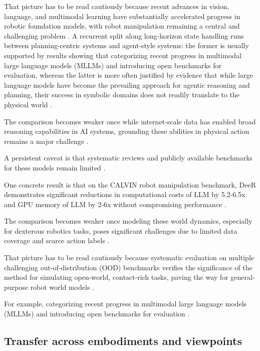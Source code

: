 \documentclass[a4paper,11pt]{article}
\begin{document}
That picture has to be read cautiously because recent advances in vision, language, and multimodal learning have substantially accelerated progress in robotic foundation models, with robot manipulation remaining a central and challenging problem \citep{Bai2025Embodied}. A recurrent split along long-horizon state handling runs between planning-centric systems and agent-style systems: the former is usually supported by results showing that categorizing recent progress in multimodal large language models (MLLMs) and introducing open benchmarks for evaluation, whereas the latter is more often justified by evidence that while large language models have become the prevailing approach for agentic reasoning and planning, their success in symbolic domains does not readily translate to the physical world \citep{Tang2025Mind,Zheng2025Multimodal,Felicia2026From}.

The comparison becomes weaker once while internet-scale data has enabled broad reasoning capabilities in AI systems, grounding these abilities in physical action remains a major challenge \citep{Tang2025Mind}.

A persistent caveat is that systematic reviews and publicly available benchmarks for these models remain limited \citep{Zheng2025Multimodal}.

One concrete result is that on the CALVIN robot manipulation benchmark, DeeR demonstrates significant reductions in computational costs of LLM by 5.2-6.5x and GPU memory of LLM by 2-6x without compromising performance \citep{Yue2024Deer}.

The comparison becomes weaker once modeling these world dynamics, especially for dexterous robotics tasks, poses significant challenges due to limited data coverage and scarce action labels \citep{Gao2026Dreamdojo}.

That picture has to be read cautiously because systematic evaluation on multiple challenging out-of-distribution (OOD) benchmarks verifies the significance of the method for simulating open-world, contact-rich tasks, paving the way for general-purpose robot world models \citep{Gao2026Dreamdojo}.

For example, categorizing recent progress in multimodal large language models (MLLMs) and introducing open benchmarks for evaluation \citep{Zheng2025Multimodal}.

\subsection{Transfer across embodiments and viewpoints}
\end{document}
